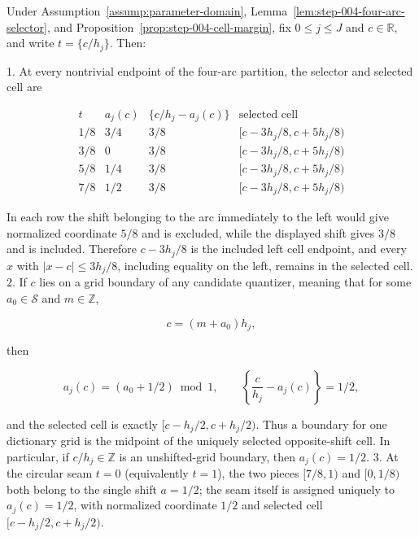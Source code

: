 \begin{lemma}\label{lem:step-004-boundary-trace}
Under Assumption~\ref{assump:parameter-domain}, Lemma~\ref{lem:step-004-four-arc-selector}, and Proposition~\ref{prop:step-004-cell-margin}, fix \(0\le j\le J\) and \(c\in\mathbb R\), and write \(t=\{c/h_j\}\). Then:

1. At every nontrivial endpoint of the four-arc partition, the selector and selected cell are

   \[
   \begin{array}{c|c|c|c}
   t & a_j(c) & \{c/h_j-a_j(c)\} & \text{selected cell}\\ \hline
   1/8 & 3/4 & 3/8 & [c-3h_j/8,c+5h_j/8)\\
   3/8 & 0 & 3/8 & [c-3h_j/8,c+5h_j/8)\\
   5/8 & 1/4 & 3/8 & [c-3h_j/8,c+5h_j/8)\\
   7/8 & 1/2 & 3/8 & [c-3h_j/8,c+5h_j/8)
   \end{array}
   \]

   In each row the shift belonging to the arc immediately to the left would give normalized coordinate \(5/8\) and is excluded, while the displayed shift gives \(3/8\) and is included. Therefore \(c-3h_j/8\) is the included left cell endpoint, and every \(x\) with \(|x-c|\le3h_j/8\), including equality on the left, remains in the selected cell.
2. If \(c\) lies on a grid boundary of any candidate quantizer, meaning that for some \(a_0\in\mathcal S\) and \(m\in\mathbb Z\),

   \[
   c=(m+a_0)h_j,
   \]

   then

   \[
   a_j(c)=(a_0+1/2)\bmod 1,
   \qquad
   \left\{\frac{c}{h_j}-a_j(c)\right\}=1/2,
   \]

   and the selected cell is exactly \([c-h_j/2,c+h_j/2)\). Thus a boundary for one dictionary grid is the midpoint of the uniquely selected opposite-shift cell. In particular, if \(c/h_j\in\mathbb Z\) is an unshifted-grid boundary, then \(a_j(c)=1/2\).
3. At the circular seam \(t=0\) (equivalently \(t=1\)), the two pieces \([7/8,1)\) and \([0,1/8)\) both belong to the single shift \(a=1/2\); the seam itself is assigned uniquely to \(a_j(c)=1/2\), with normalized coordinate \(1/2\) and selected cell \([c-h_j/2,c+h_j/2)\).
\end{lemma}


